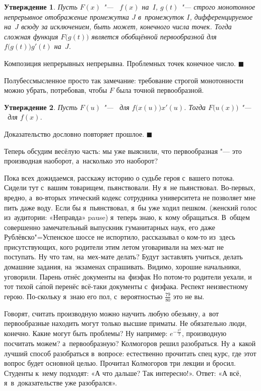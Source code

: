 \documentclass[a4paper,10pt,twoside]{article}
\newtheorem{Ut}{Утверждение}[section]
\newenvironment{Proof}
       {\par\noindent{\textbf{Доказательство.}}}
       {\hfill$\scriptstyle\blacksquare$}
\begin{document}
\begin{Ut}
  Пусть $F(x)$ "--- \op\ $f(x)$ на~$I$, $g(t)$ "--- строго монотонное непрерывное отображение промежутка $J$ в~промежуток $I$, дифференцируемое на~$J$
  всюду за исключением, быть может, конечного числа точек. Тогда сложная функция $F\big(g(t)\big)$ является обобщённой первообразной для
  $f\big(g(t)\big)g'(t)$ на~$J$.
\end{Ut}

\begin{Proof}
  Композиция непрерывных непрерывна. Проблемных точек конечное число.
\end{Proof}

Полубессмысленное просто так замечание: требование строгой монотонности можно убрать, потребовав, чтобы $F$  была точной первообразной.

\begin{Ut}
  Пусть $F(u)$ "--- \op\ для $f\big(x(u)\big)x'(u)$. Тогда $F\big(u(x)\big)$ "--- \op\ для $f(x)$.
\end{Ut}

\begin{Proof}
  Доказательство дословно повторяет прошлое.
\end{Proof}

Теперь обсудим весёлую часть: мы уже выяснили, что первообразная "--- это производная наоборот, а~насколько это наоборот?

Пока всех дожидаемся, расскажу историю о судьбе героя с~вашего потока. Сидели тут с~вашим товарищем, пьянствовали. Ну я~не пьянствовал.
Во-первых, вредно, а~во-вторых этический кодекс сотрудника университета не позволяет мне пить даже воду. Если бы я~пьянствовал, я~бы уже ходил пешком.
(женский голос из~аудитории: «Неправда\ldotse{}»  pause\ldotst{}) я~теперь знаю, к~кому обращаться. В~общем совершенно замечательный выпускник гуманитарных наук, его даже Рублёвско"=Успенское шоссе не испортило, рассказывал о ком-то из~здесь присутствующих, кого родители этим летом уговаривали
на мех-мат не поступать. Ну что там, на~мех-мате делать? Будут заставлять учиться, делать домашние задания, на~экзаменах спрашивать. Видимо, хорошие начальники, уговорили. Парень отнёс документы на~физфак\ldotst{} Но потом-то родители уехали, и тот тихой с\'{а}пой перенёс всё-таки документы с~физфака.
Респект неизвестному герою. По-скольку я~знаю его пол, с~вероятностью $\frac{79}{80}$ это не вы.

Говорят, считать производную можно научить любую обезьяну, а~вот первообразные находить могут только высшие приматы. Не обязательно люди, конечно.
Какие могут быть проблемы? Ну например: $e^{-\frac{x^2}2}$, производную посчитать можем? а~первообразную? Колмогоров решил разобраться.
Ну а~какой лучший способ разобраться в~вопросе: естественно прочитать спец курс, где этот вопрос будет основной целью. Прочитал Колмогоров три лекции
и бросил. Студенты к~нему подходят: «А что дальше? Так интересно!». Ответ: «А всё, я~в~доказательстве уже разобрался».
\end{document}
